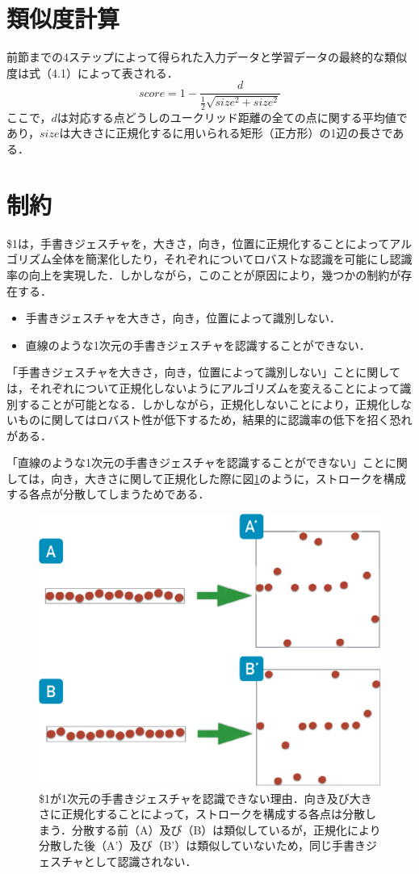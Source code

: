 \section{類似度計算}
前節までの4ステップによって得られた入力データと学習データの最終的な類似度は式（4.1）によって表される．
\begin{equation}
score = 1 - \frac{d}{\frac{1}{2}\sqrt{size^2 + size^2}}
\end{equation}
ここで，$d$は対応する点どうしのユークリッド距離の全ての点に関する平均値であり，$size$は大きさに正規化するに用いられる矩形（正方形）の1辺の長さである．

\section{制約}
\$1は，手書きジェスチャを，大きさ，向き，位置に正規化することによってアルゴリズム全体を簡潔化したり，それぞれについてロバストな認識を可能にし認識率の向上を実現した．しかしながら，このことが原因により，幾つかの制約が存在する．

\begin{itemize}
\item 手書きジェスチャを大きさ，向き，位置によって識別しない．
\item 直線のような1次元の手書きジェスチャを認識することができない．
\end{itemize}


「手書きジェスチャを大きさ，向き，位置によって識別しない」ことに関しては，それぞれについて正規化しないようにアルゴリズムを変えることによって識別することが可能となる．しかしながら，正規化しないことにより，正規化しないものに関してはロバスト性が低下するため，結果的に認識率の低下を招く恐れがある．

「直線のような1次元の手書きジェスチャを認識することができない」ことに関しては，向き，大きさに関して正規化した際に図\ref{fig:line}のように，ストロークを構成する各点が分散してしまうためである．

\begin{figure} [!h]
\centering
\includegraphics [width=0.6\columnwidth]{img/line.eps}
\caption{\$1が1次元の手書きジェスチャを認識できない理由．向き及び大きさに正規化することによって，ストロークを構成する各点は分散しまう．分散する前（A）及び（B）は類似しているが，正規化により分散した後（A'）及び（B'）は類似していないため，同じ手書きジェスチャとして認識されない．}
\label{fig:line}
\end{figure}

